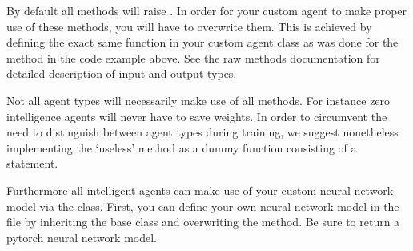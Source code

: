 \documentclass[letterpaper,10pt,english]{sphinxmanual}
\begin{document}
\sphinxAtStartPar
By default all methods will raise . In order for your custom agent to make proper use of these
methods, you will have to overwrite them. This is achieved by defining the exact same function in your custom agent
class as was done for the  method in the code example above. See the raw methods documentation for
detailed description of input and output types.

\sphinxAtStartPar
{} Not all agent types will necessarily make use of all methods. For instance zero intelligence agents will
never have to save weights. In order to circumvent the need to distinguish between agent types during training, we
suggest nonetheless implementing the ‘useless’ method as a dummy function consisting of a  statement.

\sphinxAtStartPar
Furthermore all intelligent agents can make use of your custom neural network model via the  class.
First, you can define your own neural network model in the  file by inheriting the
 base class and overwriting the  method. Be sure to return a pytorch neural
network model.
\end{document}
